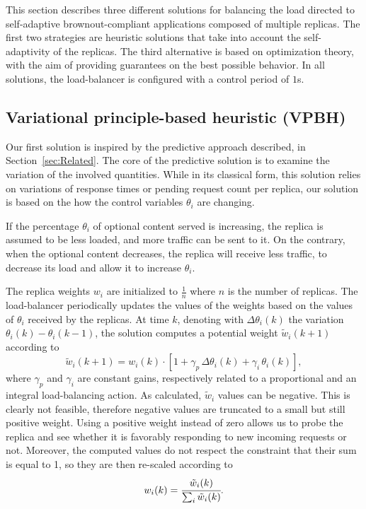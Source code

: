 This section describes three different solutions for balancing the
load directed to self-adaptive brownout-compliant applications
composed of multiple replicas. The first two strategies are heuristic
solutions that take into account the self-adaptivity of the
replicas. The third alternative is based on optimization theory, with
the aim of providing guarantees on the best possible behavior. In all
solutions, the load-balancer is configured with a control period of $1$s.

\subsection{Variational principle-based heuristic (VPBH)}

Our first solution is inspired by the predictive approach described, in
Section~\ref{sec:Related}. The core of the predictive solution is to
examine the variation of the involved quantities. While in its
classical form, this solution relies on variations of response times
or pending request count per replica, our solution is based on the how the
control variables $\theta_i$ are changing.

If the percentage $\theta_i$ of optional content served is increasing,
the replica is assumed to be less loaded, and more traffic can be sent
to it. On the contrary, when the optional content decreases, the
replica will receive less traffic, to decrease its load and allow it to increase
$\theta_i$.

The replica weights $w_i$ are initialized to $\frac{1}{n}$ where $n$
is the number of replicas. The load-balancer periodically updates the
values of the weights based on the values of $\theta_i$ received by
the replicas. At time $k$, denoting with $\Delta \theta_i (k)$ the
variation $\theta_i (k) - \theta_i (k-1)$, the solution computes a
potential weight $\tilde{w}_i(k+1)$ according to
\begin{equation}
  \tilde{w}_i(k+1) = w_i(k) \cdot 
\left[ 1 + \gamma_p \, \Delta \theta_i (k) + \gamma_i \, \theta_i (k) \right] ,
\label{eq:theta-diff}
\end{equation}
where $\gamma_p$ and $\gamma_i$ are constant gains, respectively
related to a proportional and an integral load-balancing action. As
calculated, $\tilde{w}_i$ values can be negative. This is clearly not
feasible, therefore negative values are truncated to a small but still
positive weight. Using a positive weight instead of zero allows us to
probe the replica and see whether it is favorably responding to new
incoming requests or not. Moreover, the computed values do not respect
the constraint that their sum is equal to 1, so they are then
re-scaled according to
\begin{equation}
  w_i (k) = \cfrac{\tilde{w}_i (k)}{\sum_i \tilde{w}_i (k)}.
\label{eq:theta-diff-rescale}
\end{equation}

